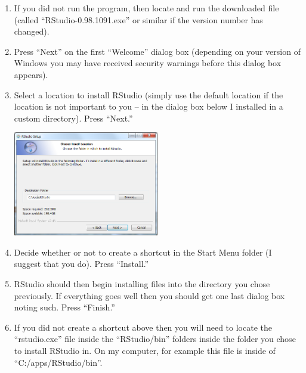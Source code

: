 \documentclass{article}\usepackage[]{graphicx}\usepackage[]{color}
\begin{document}
\begin{enumerate}
  \item If you did not run the program, then locate and run the downloaded file (called ``RStudio-0.98.1091.exe'' or similar if the version number has changed).

  \item Press ``Next'' on the first ``Welcome'' dialog box (depending on your version of Windows you may have received security warnings before this dialog box appears).

  \item Select a location to install RStudio (simply use the default location if the location is not important to you -- in the dialog box below I installed in a custom directory).  Press ``Next.''
\begin{center}
  \includegraphics[width=2.5in]{Figs/RStudio_Install_Directory.png}
\end{center}

  \item Decide whether or not to create a shortcut in the Start Menu folder (I suggest that you do).  Press ``Install.''

  \item RStudio should then begin installing files into the directory you chose previously.  If everything goes well then you should get one last dialog box noting such.  Press ``Finish.''

  \item If you did not create a shortcut above then you will need to locate the ``rstudio.exe'' file inside the ``RStudio/bin'' folders inside the folder you chose to install RStudio in.  On my computer, for example this file is inside of ``C:/apps/RStudio/bin''.
\end{enumerate}
\end{document}
